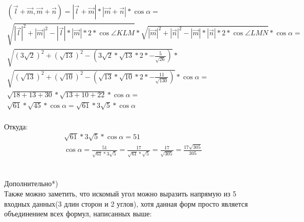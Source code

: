 		\begin{gather*} 
			(\overrightarrow{l} + \overrightarrow{m}, \overrightarrow{m} + \overrightarrow{n}) = |\overrightarrow{l} + \overrightarrow{m}|*|\overrightarrow{m} + \overrightarrow{n}|*\cos\alpha = \\
			\sqrt{|\overrightarrow{l}|^2 + |\overrightarrow{m}|^2 - |\overrightarrow{l}|*|\overrightarrow{m}|*2*\cos\angle KLM}*\sqrt{|\overrightarrow{m}|^2 + |\overrightarrow{n}|^2 - |\overrightarrow{m}|*|\overrightarrow{n}|*2*\cos\angle LMN}*\cos\alpha = \\
			\sqrt{(3\sqrt{2})^2 + (\sqrt{13})^2 - (3\sqrt{2} * \sqrt{13} * 2 * -\frac{5}{\sqrt{26}})} * \\
			\sqrt{(\sqrt{13})^2 + (\sqrt{10})^2 - (\sqrt{13} * \sqrt{10} * 2 * -\frac{11}{\sqrt{130}})}*\cos\alpha = \\
			\sqrt{18 + 13 + 30}*\sqrt{13 + 10 + 22}*\cos\alpha = \\
			\sqrt{61}*\sqrt{45}*\cos\alpha = \sqrt{61}*3\sqrt{5}*\cos\alpha
		\end{gather*}
		\\
		Откуда:
		\begin{gather*} 
			\sqrt{61}*3\sqrt{5}*\cos\alpha = 51\\
			\cos\alpha = \frac{51}{\sqrt{61} * 3\sqrt{5}} = \frac{17}{\sqrt{61} * \sqrt{5}} =\frac{17}{\sqrt{305}} = \frac{17\sqrt{305}}{305}
		\end{gather*} 
		\\ \\
		Дополнительно*)\\
		Также можно заметить, что искомый угол можно выразить напрямую из 5 входных данных(3 длин сторон и 2 углов), хотя данная форм просто является объединением всех формул, написанных выше:
